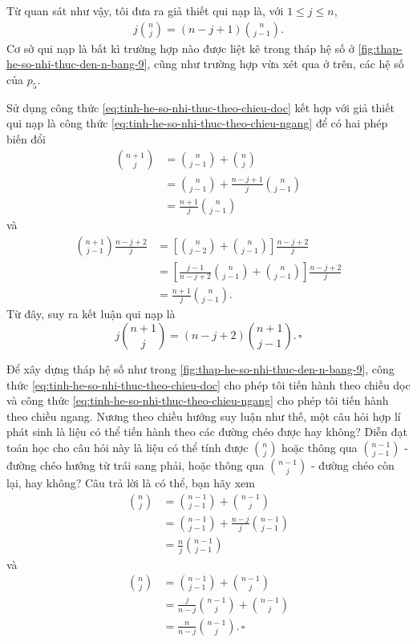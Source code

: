 \documentclass[12pt]{article} %
\begin{document}
Từ quan sát như vậy, tôi đưa ra giả thiết qui nạp là, với \(1\leq j \leq n\), 
\begin{align}
    j\binom{n}{j}=(n-j+1)\binom{n}{j-1}. \label{eq:tinh-he-so-nhi-thuc-theo-chieu-ngang}
\end{align}
Cơ sở qui nạp là bất kì trường hợp nào được liệt kê trong tháp hệ số ở \autoref{fig:thap-he-so-nhi-thuc-den-n-bang-9}, cũng như trường hợp vừa xét qua ở trên, các hệ số của \(p_5\).

Sử dụng công thức \eqref{eq:tinh-he-so-nhi-thuc-theo-chieu-doc} kết hợp với giả thiết qui nạp là công thức \eqref{eq:tinh-he-so-nhi-thuc-theo-chieu-ngang} để có hai phép biến đổi
\begin{align*}
    \binom{n+1}{j} 
        &= \binom{n}{j-1}+\binom{n}{j} \\
        &= \binom{n}{j-1}+\frac{n-j+1}{j}\binom{n}{j-1} \\
        &= \frac{n+1}{j}\binom{n}{j-1}
\end{align*}
và\begin{align*}
    \binom{n+1}{j-1}\frac{n-j+2}{j} 
        &= \left[\binom{n}{j-2}+\binom{n}{j-1} \right] \frac{n-j+2}{j} \\
        &= \left[\frac{j-1}{n-j+2}\binom{n}{j-1}+\binom{n}{j-1} \right] \frac{n-j+2}{j} \\
        &= \frac{n+1}{j}\binom{n}{j-1}.
\end{align*}
Từ đây, suy ra kết luận qui nạp là
\[ j\binom{n+1}{j} = (n-j+2)\binom{n+1}{j-1}.\,\square\]

Để xây dựng tháp hệ số như trong \autoref{fig:thap-he-so-nhi-thuc-den-n-bang-9}, công thức \eqref{eq:tinh-he-so-nhi-thuc-theo-chieu-doc} cho phép tôi tiến hành theo chiều dọc và công thức \eqref{eq:tinh-he-so-nhi-thuc-theo-chieu-ngang} cho phép tôi tiến hành theo chiều ngang. Nương theo chiều hướng suy luận như thế, một câu hỏi hợp lí phát sinh là liệu có thể tiến hành theo các đường chéo được hay không? Diễn đạt toán học cho câu hỏi này là liệu có thể tính được \(\binom{n}{j}\) hoặc thông qua \(\binom{n-1}{j-1}\) - đường chéo hướng từ trái sang phải, hoặc thông qua \(\binom{n-1}{j}\) - đường chéo còn lại, hay không? Câu trả lời là có thể, bạn hãy xem
\begin{align*}
    \binom{n}{j} 
        &= \binom{n-1}{j-1}+\binom{n-1}{j} \\
        &= \binom{n-1}{j-1}+\frac{n-j}{j}\binom{n-1}{j-1} \\
        &= \frac{n}{j}\binom{n-1}{j-1}
\end{align*}
và
\begin{align*}
    \binom{n}{j} 
        &= \binom{n-1}{j-1}+\binom{n-1}{j} \\
        &= \frac{j}{n-j}\binom{n-1}{j}+\binom{n-1}{j} \\
        &= \frac{n}{n-j}\binom{n-1}{j}.\,\square
\end{align*}
\end{document}
